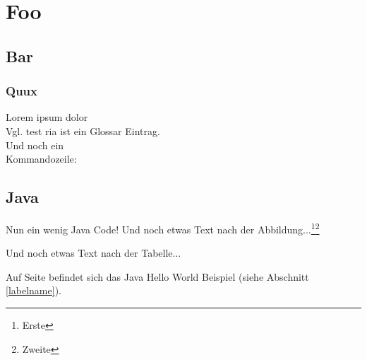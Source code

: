 \chapter{Foo}

\begin{intro}
	\Blindtext[1]
\end{intro}

	\section{Bar}
		\subsection{Quux}
Lorem ipsum dolor\\
Vgl. test
\gls{ria} ist ein Glossar Eintrag.\\
Und noch ein \\
Kommandozeile: 
\Blindtext[2][2]

	\section{Java}
	
Nun ein wenig Java Code!
Und noch etwas Text nach der Abbildung...\footnote{Erste}\footnote{Zweite}


Und noch etwas Text nach der Tabelle...

Auf Seite \pageref{java:example} befindet sich das Java Hello World Beispiel (siehe Abschnitt \ref{labelname}).

